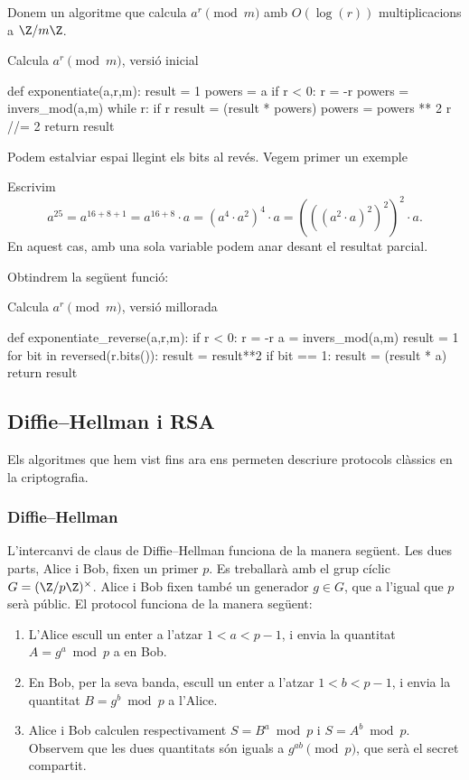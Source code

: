  Donem un algoritme que calcula $a^r\pmod{m}$ amb $O(\log(r))$ multiplicacions a $\Z/m\Z$.
 
 \begin{algo}
 \caption{Calcula $a^r\pmod m$, versió inicial}
\begin{python}
def exponentiate(a,r,m):
    result = 1
    powers = a %
    if r < 0:
        r = -r
        powers = invers_mod(a,m)
    while r:
        if r %
            result = (result * powers) %
        powers = powers ** 2 %
        r //= 2
    return result
\end{python}
  \end{algo}
  
 Podem estalviar espai llegint els bits al revés. Vegem primer un exemple
 \begin{example}
 Escrivim
 \[
 a^{25} = a^{16+8+1} = a^{16+8}\cdot a = (a^{4}\cdot a^2)^4\cdot a = (((a^2\cdot a)^2)^2)^2\cdot a.
 \]
 En aquest cas, amb una sola variable podem anar desant el resultat parcial.
 \end{example}
 
 Obtindrem la següent funció:
  \begin{algo}
 \caption{Calcula $a^r\pmod m$, versió millorada}
 \begin{python}
def exponentiate_reverse(a,r,m):
    if r < 0:
        r = -r
        a = invers_mod(a,m)
    result = 1
    for bit in reversed(r.bits()):
        result = result**2 %
        if bit == 1:
            result = (result * a) %
    return result
 \end{python}
 \end{algo}
 
\subsection{Diffie--Hellman i RSA}
Els algoritmes que hem vist fins ara ens permeten descriure protocols clàssics en la criptografia.

\subsubsection{Diffie--Hellman}
\label{sec:diffie-hellman}
L'intercanvi de claus de Diffie--Hellman  funciona de la manera següent. Les dues parts, Alice i Bob, fixen un primer $p$. Es treballarà amb el grup cíclic $G = (\Z/p\Z)^\times$. Alice i Bob fixen també un generador $g\in G$, que a l'igual que $p$ serà públic. El protocol funciona de la manera següent:
\begin{enumerate}
    \item L'Alice escull un enter a l'atzar $1<a<p-1$, i envia la quantitat $A=g^a\bmod{p}$ a en Bob.
    \item En Bob, per la seva banda, escull un enter a l'atzar $1<b<p-1$, i envia la quantitat $B=g^b\bmod{p}$ a l'Alice.
    \item Alice i Bob calculen respectivament $S=B^a\bmod{p}$ i $S=A^b\bmod{p}$. Observem que les dues quantitats són iguals a $g^{ab}\pmod{p}$, que serà el secret compartit.
\end{enumerate}


